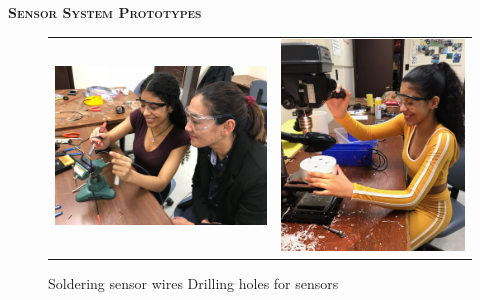 \documentclass[final,t]{beamer}
\begin{document}
\begin{frame}{}
\begin{columns}
\begin{column}{.5\linewidth}
\begin{block}{\textsc{\textbf{Sensor System Prototypes}}}
                    \begin{center}
                    \begin{figure}
                    \begin{tabular}{cc}
                    \includegraphics[scale = 0.15]{assets/IMG_9097.JPG}
                    \hspace*{5mm}
                    &
                    \includegraphics[scale = 0.42]{assets/meworking1}
                    \end{tabular}
                    \caption{Soldering sensor wires \hspace{30mm} Drilling holes for sensors}
                    \end{figure}
                    \end{center}


\end{block}
\end{column}
\end{columns}
\end{frame}
\end{document}
